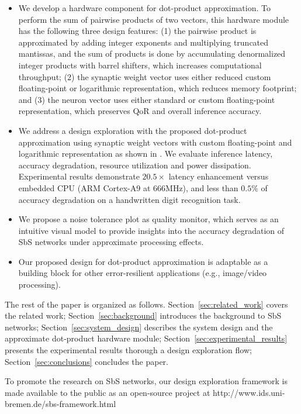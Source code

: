 \begin{itemize}
	\item We develop a hardware component for dot-product approximation. To perform the sum of pairwise products of two vectors, this hardware module has the following three design features: (1) the pairwise product is approximated by adding integer exponents and multiplying truncated mantissas, and the sum of products is done by accumulating denormalized integer products with barrel shifters, which increases computational throughput; (2) the synaptic weight vector uses either reduced custom floating-point or logarithmic representation, which reduces memory footprint; and (3) the neuron vector uses either standard or custom floating-point representation, which preserves QoR and overall inference accuracy.
	\item We address a design exploration with the proposed dot-product approximation using synaptic weight vectors with custom floating-point and logarithmic representation as shown in . We evaluate inference latency, accuracy degradation, resource utilization and power dissipation. Experimental results demonstrate $20.5\times$ latency enhancement versus embedded CPU (ARM Cortex-A9 at 666MHz), and less than $0.5\%$ of accuracy degradation on a handwritten digit recognition task.
	\item We propose a noise tolerance plot as quality monitor, which serves as an intuitive visual model to provide insights into the accuracy degradation of SbS networks under approximate processing effects.
	\item Our proposed design for dot-product approximation is adaptable as a building block for other error-resilient applications (e.g., image/video processing).
\end{itemize}


The rest of the paper is organized as follows. Section~\ref{sec:related_work} covers the related work; Section~\ref{sec:background} introduces the background to SbS networks; Section~\ref{sec:system_design} describes the system design and the approximate dot-product hardware module; Section~\ref{sec:experimental_results} presents the experimental results thorough a design exploration flow; Section~\ref{sec:conclusions} concludes the paper.


To promote the research on SbS networks, our design exploration framework is made available to the public as an open-source project at http://www.ids.uni-bremen.de/sbs-framework.html

